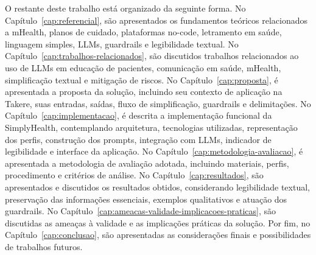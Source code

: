 O restante deste trabalho está organizado da seguinte forma. No Capítulo~\ref{cap:referencial}, são apresentados os fundamentos teóricos relacionados a mHealth, planos de cuidado, plataformas no-code, letramento em saúde, linguagem simples, LLMs, guardrails e legibilidade textual. No Capítulo~\ref{cap:trabalhos-relacionados}, são discutidos trabalhos relacionados ao uso de LLMs em educação de pacientes, comunicação em saúde, mHealth, simplificação textual e mitigação de riscos. No Capítulo~\ref{cap:proposta}, é apresentada a proposta da solução, incluindo seu contexto de aplicação na Takere, suas entradas, saídas, fluxo de simplificação, guardrails e delimitações. No Capítulo~\ref{cap:implementacao}, é descrita a implementação funcional da SimplyHealth, contemplando arquitetura, tecnologias utilizadas, representação dos perfis, construção dos prompts, integração com LLMs, indicador de legibilidade e interface da aplicação. No Capítulo~\ref{cap:metodologia-avaliacao}, é apresentada a metodologia de avaliação adotada, incluindo materiais, perfis, procedimento e critérios de análise. No Capítulo~\ref{cap:resultados}, são apresentados e discutidos os resultados obtidos, considerando legibilidade textual, preservação das informações essenciais, exemplos qualitativos e atuação dos guardrails. No Capítulo~\ref{cap:ameacas-validade-implicacoes-praticas}, são discutidas as ameaças à validade e as implicações práticas da solução. Por fim, no Capítulo~\ref{cap:conclusao}, são apresentadas as considerações finais e possibilidades de trabalhos futuros.
